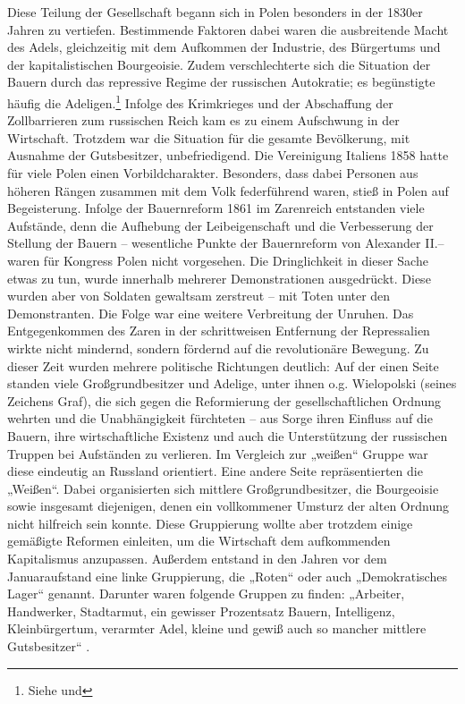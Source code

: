 \documentclass{../../sem_paper}
\begin{document}
Diese Teilung der Gesellschaft begann sich in Polen besonders in der 1830er Jahren zu vertiefen.
Bestimmende Faktoren dabei waren die ausbreitende Macht des Adels, gleichzeitig mit dem
Aufkommen der Industrie, des Bürgertums und der kapitalistischen Bourgeoisie. Zudem
verschlechterte sich die Situation der Bauern durch das repressive Regime der russischen Autokratie; 
es begünstigte häufig die Adeligen.\footnote{
Siehe  und 
} Infolge des Krimkrieges und der Abschaffung der
Zollbarrieren zum russischen Reich kam es zu einem Aufschwung in der Wirtschaft.\autocite[79--81]{gentzen1958} Trotzdem war
die Situation für die gesamte Bevölkerung, mit Ausnahme der Gutsbesitzer, unbefriedigend. Die
Vereinigung Italiens 1858 hatte für viele Polen einen Vorbildcharakter.\autocite[52]{gentzen1958} 
Besonders, dass dabei
Personen aus höheren Rängen zusammen mit dem Volk federführend waren, stieß in Polen auf
Begeisterung. Infolge der Bauernreform 1861 im Zarenreich entstanden viele Aufstände, denn
die Aufhebung der Leibeigenschaft und die Verbesserung der Stellung der Bauern – wesentliche
Punkte der Bauernreform von Alexander II.– waren für Kongress Polen nicht vorgesehen. Die
Dringlichkeit in dieser Sache etwas zu tun, wurde innerhalb mehrerer Demonstrationen
ausgedrückt. Diese wurden aber von Soldaten gewaltsam zerstreut – mit Toten unter den
Demonstranten. Die Folge war eine weitere Verbreitung der Unruhen. Das Entgegenkommen des
Zaren in der schrittweisen Entfernung der Repressalien wirkte nicht mindernd, sondern fördernd auf
die revolutionäre Bewegung. Zu dieser Zeit wurden mehrere politische Richtungen deutlich: Auf
der einen Seite standen viele Großgrundbesitzer und Adelige, unter ihnen o.g. Wielopolski (seines
Zeichens Graf), die sich gegen die Reformierung der gesellschaftlichen Ordnung wehrten und die
Unabhängigkeit fürchteten – aus Sorge ihren Einfluss auf die Bauern, ihre wirtschaftliche Existenz
und auch die Unterstützung der russischen Truppen bei Aufständen zu verlieren. Im Vergleich zur
„weißen“ Gruppe war diese eindeutig an Russland orientiert. Eine andere Seite repräsentierten
die „Weißen“. Dabei organisierten sich mittlere Großgrundbesitzer, die Bourgeoisie sowie
insgesamt diejenigen, denen ein vollkommener Umsturz der alten Ordnung nicht hilfreich sein
konnte. Diese Gruppierung wollte aber trotzdem einige gemäßigte Reformen einleiten, um die
Wirtschaft dem aufkommenden Kapitalismus anzupassen. Außerdem entstand in den Jahren vor
dem Januaraufstand eine linke Gruppierung, die „Roten“ oder auch „Demokratisches Lager“
genannt. Darunter waren folgende Gruppen zu finden: „Arbeiter, Handwerker, Stadtarmut, ein
gewisser Prozentsatz Bauern, Intelligenz, Kleinbürgertum, verarmter Adel, kleine und gewiß auch
so mancher mittlere Gutsbesitzer“\autocite[18]{kowalski1954} .
\end{document}
